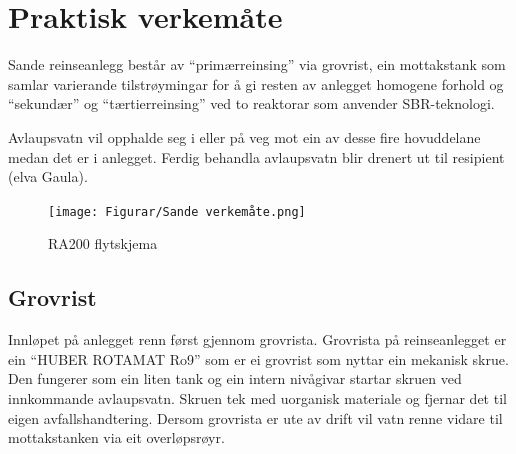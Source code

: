 \newpage
\section{Praktisk verkemåte}
\thispagestyle{fancy}

Sande reinseanlegg består av ``primærreinsing'' via grovrist, ein mottakstank 
som samlar varierande tilstrøymingar for å gi resten av anlegget homogene forhold og
``sekundær'' og ``tærtierreinsing'' ved to reaktorar som anvender \gls{SBR}-teknologi.

Avlaupsvatn vil opphalde seg i eller på veg mot ein av desse fire hovuddelane medan det er i anlegget.
Ferdig behandla avlaupsvatn blir drenert ut til resipient (elva Gaula). 

\begin{figure}[htbp]
    \centering
    \texttt{[image: Figurar/Sande verkemåte.png]} %
    \caption{\gls{RA}200 flytskjema}\label{fig:SandeVerkemaate}
\end{figure}


\subsection{Grovrist}
Innløpet på anlegget renn først gjennom grovrista. Grovrista på reinseanlegget
er ein ``HUBER ROTAMAT Ro9'' som er ei grovrist som nyttar ein mekanisk skrue.
Den fungerer som ein liten tank og ein intern nivågivar startar
skruen ved innkommande avlaupsvatn. Skruen tek med uorganisk materiale og fjernar det til eigen avfallshandtering.
Dersom grovrista er ute av drift vil vatn renne vidare til mottakstanken via eit overløpsrøyr.

